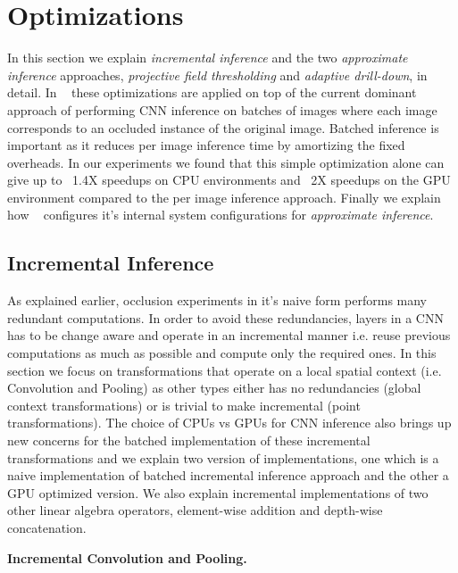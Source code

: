 \section{Optimizations}

In this section we explain \textit{incremental inference} and the two \textit{approximate inference} approaches, \textit{projective field thresholding} and \textit{adaptive drill-down}, in detail.
In \system~ these optimizations are applied on top of the current dominant approach of performing CNN inference on batches of images where each image corresponds to an occluded instance of the original image.
Batched inference is important as it reduces per image inference time by amortizing the fixed overheads.
In our experiments we found that this simple optimization alone can give up to ~1.4X speedups on CPU environments and ~2X speedups on the GPU environment compared to the per image inference approach.
Finally we explain how \system~ configures it's internal system configurations for \textit{approximate inference}.

\subsection{Incremental Inference}\label{sec:inc_computation}

As explained earlier, occlusion experiments in it's naive form performs many redundant computations.
In order to avoid these redundancies, layers in a CNN has to be change aware and operate in an incremental manner i.e. reuse previous computations as much as possible and compute only the required ones.
In this section we focus on transformations that operate on a local spatial context (i.e. Convolution and Pooling) as other types either has no redundancies (global context transformations) or is trivial to make incremental (point transformations).
The choice of CPUs vs GPUs for CNN inference also brings up new concerns for the batched implementation of these incremental transformations and we explain two version of implementations, one which is a naive implementation of batched incremental inference approach and the other a GPU optimized version.
We also explain incremental implementations of two other linear algebra operators, element-wise addition and depth-wise concatenation.

\vspace{2mm}
\noindent \textbf{Incremental Convolution and Pooling.}


